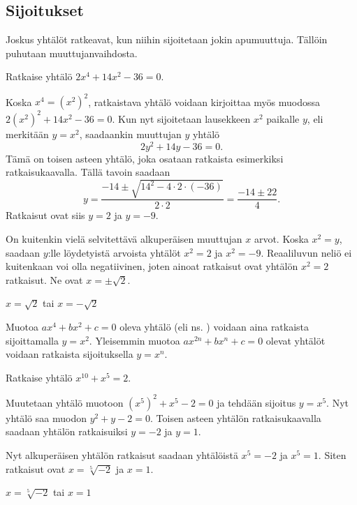 \subsection{Sijoitukset}

Joskus yhtälöt ratkeavat, kun niihin sijoitetaan jokin apumuuttuja. Tällöin puhutaan muuttujanvaihdosta.


\begin{esimerkki}
Ratkaise yhtälö $2x^4+14x^2-36=0$.

\begin{esimratk}
Koska $x^4=(x^2)^2$, ratkaistava yhtälö voidaan kirjoittaa myös muodossa $2(x^2)^2+14x^2-36=0$. Kun nyt sijoitetaan lausekkeen $x^2$ paikalle $y$, eli merkitään $y=x^2$, saadaankin muuttujan $y$ yhtälö
\[
2y^2+14y-36=0.
\]
Tämä on toisen asteen yhtälö, joka osataan ratkaista esimerkiksi ratkaisukaavalla. Tällä tavoin saadaan
\[
y=\frac{-14\pm\sqrt{14^2-4\cdot 2\cdot(-36)}}{2\cdot 2}=\frac{-14\pm 22}{4}.
\]
Ratkaisut ovat siis $y=2$ ja $y=-9$.

On kuitenkin vielä selvitettävä alkuperäisen muuttujan $x$ arvot. Koska $x^2=y$, saadaan $y$:lle löydetyistä arvoista yhtälöt $x^2=2$ ja $x^2=-9$. Reaaliluvun neliö ei kuitenkaan voi olla negatiivinen, joten ainoat ratkaisut ovat yhtälön $x^2 = 2$ ratkaisut. Ne ovat $x=\pm\sqrt{2}$.
\end{esimratk}
	\begin{esimvast}
$x=\sqrt{2}$ tai $x=-\sqrt{2}$
	\end{esimvast}
\end{esimerkki}

Muotoa $ax^4+bx^2+c=0$ oleva yhtälö (eli ns. ) voidaan aina ratkaista sijoittamalla $y=x^2$. Yleisemmin muotoa $ax^{2n}+bx^n+c=0$ olevat yhtälöt voidaan ratkaista sijoituksella $y = x^n$.

\begin{esimerkki}
Ratkaise yhtälö $x^{10}+x^5=2$.

\begin{esimratk}
Muutetaan yhtälö muotoon $(x^5)^2+x^5-2=0$ ja tehdään sijoitus $y = x^5$. Nyt yhtälö saa muodon $y^2+y-2 = 0$. Toisen asteen yhtälön ratkaisukaavalla saadaan yhtälön ratkaisuiksi $y = -2$ ja $y = 1$.

Nyt alkuperäisen yhtälön ratkaisut saadaan yhtälöistä $x^5=-2$ ja $x^5=1$. Siten ratkaisut ovat $x = \sqrt[5]{-2}$ ja $x = 1$.
\end{esimratk}
	\begin{esimvast}
$x = \sqrt[5]{-2}$ tai $x = 1$
	\end{esimvast}
\end{esimerkki}